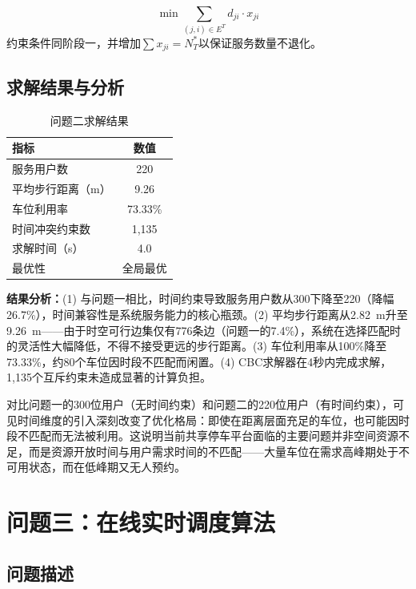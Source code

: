 \documentclass[12pt,a4paper]{ctexart}
\begin{document}
\begin{equation}\label{eq:q2s2}
  \min \sum_{(j,i) \in E^T} d_{ji} \cdot x_{ji}
\end{equation}
约束条件同阶段一，并增加$\sum x_{ji} = N^*_T$以保证服务数量不退化。

\subsection{求解结果与分析}

\begin{table}[H]
  \centering
  \caption{问题二求解结果}
  \label{tab:q2result}
  \begin{tabular}{lc}
    \toprule
    指标 & 数值 \\
    \midrule
    服务用户数 & 220 \\
    平均步行距离（m） & 9.26 \\
    车位利用率 & 73.33\% \\
    时间冲突约束数 & 1,135 \\
    求解时间（s） & 4.0 \\
    最优性 & 全局最优 \\
    \bottomrule
  \end{tabular}
\end{table}

\textbf{结果分析：}(1) 与问题一相比，时间约束导致服务用户数从300下降至220（降幅26.7\%），时间兼容性是系统服务能力的核心瓶颈。(2) 平均步行距离从2.82~m升至9.26~m——由于时空可行边集仅有776条边（问题一的7.4\%），系统在选择匹配时的灵活性大幅降低，不得不接受更远的步行距离。(3) 车位利用率从100\%降至73.33\%，约80个车位因时段不匹配而闲置。(4) CBC求解器在4秒内完成求解，1,135个互斥约束未造成显著的计算负担。

对比问题一的300位用户（无时间约束）和问题二的220位用户（有时间约束），可见时间维度的引入深刻改变了优化格局：即使在距离层面充足的车位，也可能因时段不匹配而无法被利用。这说明当前共享停车平台面临的主要问题并非空间资源不足，而是资源开放时间与用户需求时间的不匹配——大量车位在需求高峰期处于不可用状态，而在低峰期又无人预约。


\section{问题三：在线实时调度算法}

\subsection{问题描述}
\end{document}
